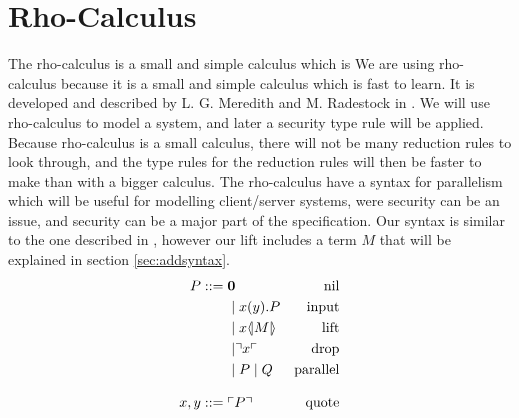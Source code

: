 \section{Rho-Calculus}
The rho-calculus is a small and simple calculus which is We are using rho-calculus because it is a small and simple calculus which is fast to learn.
It is developed and described by L. G. Meredith and M. Radestock in \citep{Meredith2005}.
We will use rho-calculus to model a system, and later a security type rule will be applied.
Because rho-calculus is a small calculus, there will not be many reduction rules to look through, and the type rules for the reduction rules will then be faster to make than with a bigger calculus.
The rho-calculus have a syntax for parallelism which will be useful for modelling client/server systems, were security can be an issue, and security can be a major part of the specification. 
Our syntax is similar to the one described in \citep{Meredith2005}, however our lift includes a term $M$ that will be explained in section \ref{sec:addsyntax}.
\begin{align*}
    P  ::= \; &  \mathbf{0} & \text{nil} \\
      & \mid x(y).P & \text{input} \\
      & \mid x \langle \! | M | \! \rangle & \text{lift} \\
      & \mid \urcorner x \ulcorner & \text{drop} \\
      & \mid P \mid Q & \text{parallel} \\[3mm]
    x,y ::= \; & \ulcorner P \urcorner & \text{quote}\\
\end{align*}



